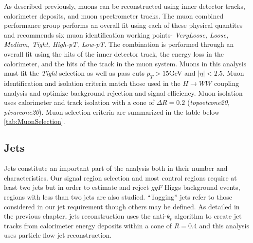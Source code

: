 As described previously, muons can be reconstructed using inner detector tracks, calorimeter deposits, and muon spectrometer tracks. The muon combined performance group performs an overall fit using each of these physical quantites and recommends six muon identification working points- \textit{VeryLoose, Loose, Medium, Tight, High-pT, Low-pT}.  The combination is performed through an overall fit using the hits of the inner detector track, the energy loss in the calorimeter, and the hits of the track in the muon system. Muons in this analysis must fit the \textit{Tight} selection as well as pass cuts $p_T>15$GeV and $|\eta|<2.5$. Muon identification and isolation criteria match those used in the $H\rightarrow WW$ coupling analysis and optimize background rejection and signal efficiency. Muon isolation uses calorimeter and track isolation with a cone of $\Delta R=0.2$ (\textit{topoetcone20, ptvarcone20}). 
Muon selection criteria are summarized in the table below \ref{tab:MuonSelection}. 

\begin{table}[h]
  \centering
  \caption{Muon selections}
  \label{tab:MuonSelection}
\end{table}


\subsection{Jets}

Jets constitute an important part of the analysis both in their number and characteristics. Our signal region selection and most control regions require at least two jets but in order to estimate and reject $ggF$ Higgs background events, regions with less than two jets are also studied. ``Tagging'' jets refer to those considered in our jet requirement though others may be defined. As detailed in the previous chapter, jets reconstruction uses the anti-$k_t$ algorithm to create jet tracks from calorimeter energy deposits within a cone of $R = 0.4$ and this analysis uses particle flow jet reconstruction.   

